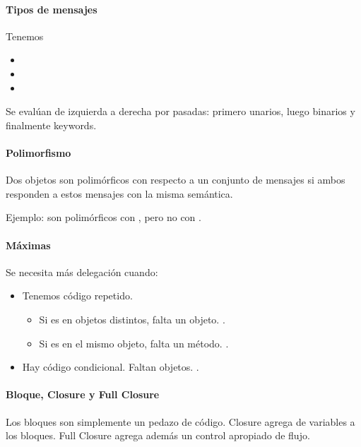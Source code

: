 \paragraph{Tipos de mensajes}

Tenemos
\begin{itemize}
  \item {}
  \item {}
  \item {}
\end{itemize}

Se evalúan de izquierda a derecha por pasadas: primero unarios, luego binarios y finalmente keywords.

\paragraph{Polimorfismo}

Dos objetos son polimórficos con respecto a un conjunto de mensajes si ambos responden a estos mensajes con la misma semántica.

Ejemplo:  son polimórficos con , pero no con .

\paragraph{Máximas}

Se necesita más delegación cuando:
\begin{itemize}
  \item Tenemos código repetido.
    \begin{itemize}
      \item Si es en objetos distintos, falta un objeto. .
      \item Si es en el mismo objeto, falta un método. .
    \end{itemize}
  \item Hay código condicional. Faltan objetos. .
\end{itemize}

\paragraph{Bloque, Closure y Full Closure}

Los bloques son simplemente un pedazo de código. Closure agrega  de variables a los bloques. Full Closure agrega además un control apropiado de flujo.


